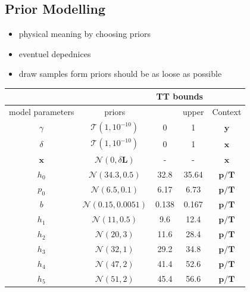\subsection{Prior Modelling}
\begin{itemize}
	\item physical meaning by choosing priors
	\item eventuel depednices
	\item draw samples form priors should be as loose as possible
\end{itemize}
\begin{table}
	\centering
	\begin{tabular}{ |c||c|c|c|c|   }
		\hline
		& &\multicolumn{2}{|c|}{TT bounds}&\\
		\hline
		model parameters& priors&\makecell{lower}& \makecell{upper\\
		}&Context\\
		\hline
		$\gamma$ & $\mathcal{T}(1,10^{-10})$ &0 &1& $\bm{y}$\\ \hhline{|=||=|=|=|=|}
		$\delta$ &$\mathcal{T}(1,10^{-10})$ & 0&1& $\bm{x}$\\ \hline
		$\bm{x}$ &$\mathcal{N}(0,\delta \bm{L})$ & -&-& $\bm{x}$\\ \hhline{|=||=|=|=|=|}
		$h_0$ &  $\mathcal{N}(34.3,0.5)$& 32.8&35.64&$\bm{p/T}$\\ \hline
		$p_0$ &  $\mathcal{N}(6.5,0.1)$&6.17 &6.73&$\bm{p/T}$\\ \hline
		$b$ &  $\mathcal{N}(0.15,0.0051)$& 0.138  &0.167&$\bm{p/T}$\\ \hline
		$h_{1}$ &  $\mathcal{N}(11,0.5)$&9.6 &12.4&$\bm{p/T}$\\ \hline
		$h_{2}$ &  $\mathcal{N}(20,3)$&11.6 &28.4&$\bm{p/T}$\\ \hline
		$h_{3}$ &  $\mathcal{N}(32,1)$&29.2 &34.8&$\bm{p/T}$\\ \hline
		$h_{4}$ &  $\mathcal{N}(47,2)$&41.4 &52.6&$\bm{p/T}$\\ \hline
		$h_{5}$ &  $\mathcal{N}(51,2)$&45.4 &56.6&$\bm{p/T}$\\ \hline

\end{tabular}
\end{table}
